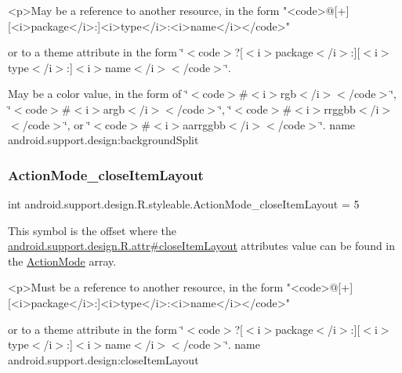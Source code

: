\begin{DoxyVerb}      <p>May be a reference to another resource, in the form "<code>@[+][<i>package</i>:]<i>type</i>:<i>name</i></code>"
\end{DoxyVerb}
 or to a theme attribute in the form \char`\"{}$<$code$>$?\mbox{[}$<$i$>$package$<$/i$>$\+:\mbox{]}\mbox{[}$<$i$>$type$<$/i$>$\+:\mbox{]}$<$i$>$name$<$/i$>$$<$/code$>$\char`\"{}. 

May be a color value, in the form of \char`\"{}$<$code$>$\#$<$i$>$rgb$<$/i$>$$<$/code$>$\char`\"{}, \char`\"{}$<$code$>$\#$<$i$>$argb$<$/i$>$$<$/code$>$\char`\"{}, \char`\"{}$<$code$>$\#$<$i$>$rrggbb$<$/i$>$$<$/code$>$\char`\"{}, or \char`\"{}$<$code$>$\#$<$i$>$aarrggbb$<$/i$>$$<$/code$>$\char`\"{}.  name android.\+support.\+design\+:background\+Split \mbox{\label{classandroid_1_1support_1_1design_1_1R_1_1styleable_a5323a23312ce2829985c0e29c45cb453}} 
\subsubsection{\texorpdfstring{Action\+Mode\+\_\+close\+Item\+Layout}{ActionMode\_closeItemLayout}}
{\footnotesize\ttfamily int android.\+support.\+design.\+R.\+styleable.\+Action\+Mode\+\_\+close\+Item\+Layout = 5\hspace{0.3cm}{\ttfamily [static]}}

This symbol is the offset where the \hyperlink{classandroid_1_1support_1_1design_1_1R_1_1attr_afdbc1658d4339331fec2a26f7f7c3ac6}{android.\+support.\+design.\+R.\+attr\#close\+Item\+Layout} attribute\textquotesingle{}s value can be found in the \hyperlink{classandroid_1_1support_1_1design_1_1R_1_1styleable_aece7cc3345738baf4a59955f870e1507}{Action\+Mode} array.

\begin{DoxyVerb}      <p>Must be a reference to another resource, in the form "<code>@[+][<i>package</i>:]<i>type</i>:<i>name</i></code>"
\end{DoxyVerb}
 or to a theme attribute in the form \char`\"{}$<$code$>$?\mbox{[}$<$i$>$package$<$/i$>$\+:\mbox{]}\mbox{[}$<$i$>$type$<$/i$>$\+:\mbox{]}$<$i$>$name$<$/i$>$$<$/code$>$\char`\"{}.  name android.\+support.\+design\+:close\+Item\+Layout \mbox{\label{classandroid_1_1support_1_1design_1_1R_1_1styleable_a95d87caaf5fc9afdda13755e2b575d00}} 
